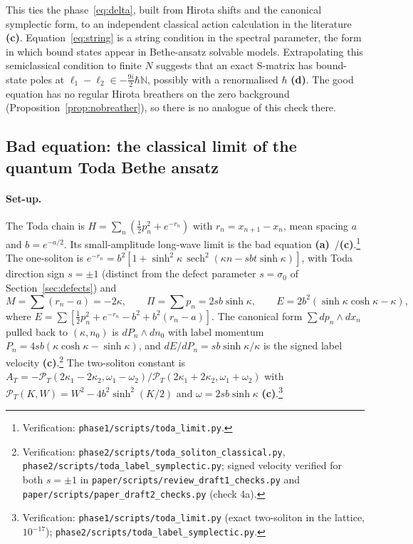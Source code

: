 \documentclass[11pt,a4paper]{article}
\newcommand{\lab}[1]{{\normalfont\sffamily\footnotesize\bfseries(#1)}}
\newcommand{\La}{\lab{a}}
\newcommand{\Lc}{\lab{c}}
\newcommand{\Ld}{\lab{d}}
\newcommand{\scr}[1]{\nolinkurl{#1}}
\newcommand{\chk}[1]{\footnote{\raggedright Verification: #1.}}
\newcommand{\hb}{\hbar}
\newcommand{\sech}{\operatorname{sech}}
\theoremstyle{remark}
\begin{document}
This ties the phase~\eqref{eq:delta}, built from Hirota shifts and the canonical symplectic form, to an independent classical action calculation in the literature \Lc. Equation~\eqref{eq:string} is a string condition in the spectral parameter, the form in which bound states appear in Bethe-ansatz solvable models. Extrapolating this semiclassical condition to finite $N$ suggests that an exact S-matrix has bound-state poles at $\ell_1-\ell_2\in-\tfrac{9i}2\hb\mathbb N$, possibly with a renormalised $\hb$ \Ld. The good equation has no regular Hirota breathers on the zero background (Proposition~\ref{prop:nobreather}), so there is no analogue of this check there.

\subsection{Bad equation: the classical limit of the quantum Toda Bethe ansatz}\label{sec:toda}

\paragraph{Set-up.} The Toda chain is $H=\sum_n(\tfrac12p_n^2+e^{-r_n})$ with $r_n=x_{n+1}-x_n$, mean spacing $a$ and $b=e^{-a/2}$. Its small-amplitude long-wave limit is the bad equation \La~\cite{Zak,BC}/\Lc.\chk{\scr{phase1/scripts/toda_limit.py}} The one-soliton is $e^{-r_n}=b^2[1+\sinh^2\kappa\,\sech^2(\kappa n-sbt\sinh\kappa)]$, with Toda direction sign $s=\pm1$ (distinct from the defect parameter $s=\sigma_0$ of Section~\ref{sec:defects}) and
\[
M=\sum(r_n-a)=-2\kappa,\qquad \Pi=\sum p_n=2sb\sinh\kappa,\qquad E=2b^2(\sinh\kappa\cosh\kappa-\kappa),
\]
where $E=\sum[\tfrac12p_n^2+e^{-r_n}-b^2+b^2(r_n-a)]$. The canonical form $\sum dp_n\wedge dx_n$ pulled back to $(\kappa,n_0)$ is $dP_n\wedge dn_0$ with label momentum $P_n=4sb(\kappa\cosh\kappa-\sinh\kappa)$, and $dE/dP_n=sb\sinh\kappa/\kappa$ is the signed label velocity \Lc.\chk{\scr{phase2/scripts/toda_soliton_classical.py}, \scr{phase2/scripts/toda_label_symplectic.py}; signed velocity verified for both $s=\pm1$ in \scr{paper/scripts/review_draft1_checks.py} and \scr{paper/scripts/paper_draft2_checks.py} (check 4a)} The two-soliton constant is $A_T=-\mathcal P_T(2\kappa_1-2\kappa_2,\omega_1-\omega_2)/\mathcal P_T(2\kappa_1+2\kappa_2,\omega_1+\omega_2)$ with $\mathcal P_T(K,W)=W^2-4b^2\sinh^2(K/2)$ and $\omega=2sb\sinh\kappa$ \Lc.\chk{\scr{phase1/scripts/toda_limit.py} (exact two-soliton in the lattice, $10^{-17}$); \scr{phase2/scripts/toda_label_symplectic.py}}
\end{document}
